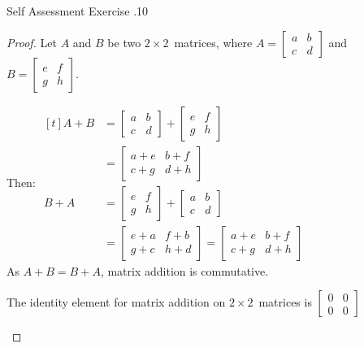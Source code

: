 \documentclass[\main/notes.tex]{subfiles}
\begin{document}
\begin{exercise}{Self Assessment Exercise \thechapter.10}
\begin{questions}
							\begin{answer}
								\begin{proof}
									Let $A$ and $B$ be two $2 \times 2$~matrices, where $A = \begin{bmatrix}a & b\\ c & d\end{bmatrix}$ and $B = \begin{bmatrix}e & f\\g & h\end{bmatrix}$.
									\begin{subproof}[Commutativity]
										Then: $ \begin{aligned}[t]
											A + B &= \begin{bmatrix}a & b\\ c & d\end{bmatrix} + \begin{bmatrix}e & f\\g & h\end{bmatrix}\\
											&= \begin{bmatrix}
												a + e & b + f\\
												c + g & d + h
											\end{bmatrix}\\
											B + A &= \begin{bmatrix}e & f\\g & h\end{bmatrix} + \begin{bmatrix}a & b\\ c & d\end{bmatrix}\\
											&= \begin{bmatrix}
												e + a & f + b\\
												g + c & h + d
											\end{bmatrix} = \begin{bmatrix}
												a + e & b + f\\
												c + g & d + h
											\end{bmatrix}
										\end{aligned}$\\
										As $A + B = B + A$, matrix addition is commutative.
									\end{subproof}
									\begin{subproof}[Identity]
										The identity element for matrix addition on $2 \times 2$~matrices is $\begin{bmatrix}0 & 0 \\ 0 & 0\end{bmatrix}$

\end{subproof}
\end{proof}
\end{answer}
\end{questions}
\end{exercise}
\end{document}
